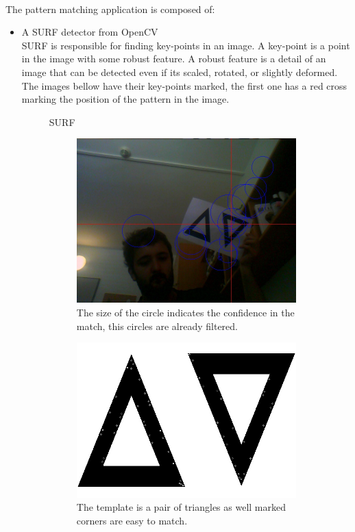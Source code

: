 \documentclass[11pt,twoside,a4paper]{article}
\begin{document}
\paragraph {} The pattern matching application is composed of:
\begin{itemize}
  \item A SURF detector from OpenCV\\
SURF is responsible for finding key-points in an image. A key-point is a point
in the image with some robust feature. A robust feature is a detail of an image
that can be detected even if its scaled, rotated, or slightly deformed.\\
The images bellow have their key-points marked, the first one has a red cross
marking the position of the pattern in the image.
\begin{figure}[hbtp]
  \centering
SURF
\begin{subfigure}{1.00\textwidth}
  \centering
  \includegraphics[width=1.0\linewidth]{image_marked.jpg}
  The size of the circle indicates the confidence in the match, this circles are
already filtered.
\end{subfigure}
\begin{subfigure}{1.00\textwidth}
  \centering
  \includegraphics[width=1.0\linewidth]{template_marked.jpg}
  The template is a pair of triangles as well marked corners are easy to match.
\end{subfigure}
\end{figure}



\end{itemize}
\end{document}
